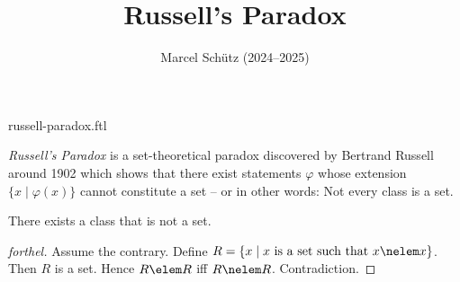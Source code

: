 \documentclass{article}
\title{Russell's Paradox}
\author{Marcel Schütz (2024--2025)}
\date{}
\begin{document}
\begin{smodule}{russell-paradox.ftl}
\maketitle


\noindent \emph{Russell's Paradox} is a set-theoretical paradox discovered by
Bertrand Russell around 1902 \cite[chapter XV]{Frege1980} which shows that 
there exist statements $\varphi$ whose extension
$\{x\mid\varphi(x)\}$ cannot constitute a set -- or in other words:
Not every class is a set.

\begin{forthel}
  \begin{theorem}[title=Russell's Paradox]
    There exists a class that is not a set.
  \end{theorem}
  \begin{proof}[forthel]
    Assume the contrary.
    Define $R = \{x \mid x \text{ is a set such that } x \nelem x\}$.
    Then $R$ is a set.
    Hence $R \elem R$ iff $R \nelem R$.
    Contradiction.
  \end{proof}
\end{forthel}

\printbibliography
{}
\end{smodule}
\end{document}
